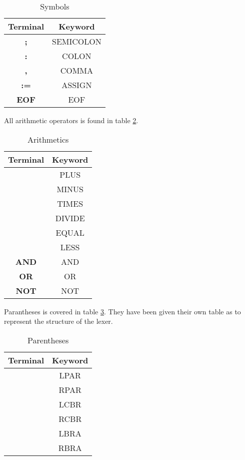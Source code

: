 \documentclass[10pt]{article}
\begin{document}
\begin{table}[h!]
\centering
\begin{tabular}{|c|c|}
Terminal & Keyword \\
\hline
\textbf{;} & SEMICOLON \\
\textbf{:} & COLON \\
\textbf{,} & COMMA \\
\textbf{:=} & ASSIGN \\
\textbf{EOF} & EOF \\
\hline
\end{tabular}
\caption{\label{tab:symbols}Symbols}
\end{table}

All arithmetic operators is found in table \ref{tab:arithmetics}.

\begin{table}[h!]
\centering
\begin{tabular}{|c|c|}
Terminal & Keyword \\
\hline
\text{+} & PLUS \\
\text{-} & MINUS \\
\text{*} & TIMES \\
\text{/} & DIVIDE \\
\text{=} & EQUAL \\
\text{<} & LESS \\
\textbf{AND} & AND \\
\textbf{OR} & OR \\
\textbf{NOT} & NOT \\
\hline
\end{tabular}
\caption{\label{tab:arithmetics}Arithmetics}
\end{table}

Parantheses is covered in table \ref{tab:parentheses}. They have been given their own table as to represent the structure of the lexer. 

\begin{table}[h!]
\centering
\begin{tabular}{|c|c|}
Terminal & Keyword \\
\hline
\text{(} & LPAR \\
\text{)} & RPAR \\
\text{\{} & LCBR \\
\text{\}} & RCBR \\
\text{[} & LBRA \\
\text{]} & RBRA \\
\hline
\end{tabular}
\caption{\label{tab:parentheses}Parentheses}
\end{table}
\end{document}
